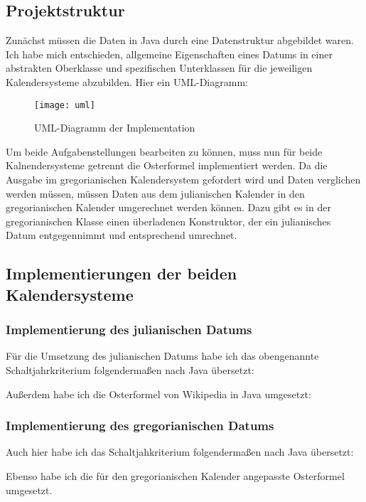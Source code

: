 \subsection{Projektstruktur}
Zunächst müssen die Daten in Java durch eine Datenstruktur abgebildet waren. Ich habe mich entschieden, allgemeine Eigenschaften eines Datums in einer abstrakten Oberklasse und spezifischen Unterklassen für die jeweiligen Kalendersysteme abzubilden. Hier ein UML-Diagramm:
\begin{figure}[h]
	\centering
	\texttt{[image: uml]}
	\caption{UML-Diagramm der Implementation}
\end{figure}

Um beide Aufgabenstellungen bearbeiten zu können, muss nun für beide Kalnendersysteme getrennt die Osterformel implementiert werden. Da die Ausgabe im gregorianischen Kalendersystem gefordert wird und Daten verglichen werden müssen, müssen Daten aus dem julianischen Kalender in den gregorianischen Kalender umgerechnet werden können. Dazu gibt es in der gregorianischen Klasse einen überladenen Konstruktor, der ein julianisches Datum entgegennimmt und entsprechend umrechnet.

\clearpage
\subsection{Implementierungen der beiden Kalendersysteme}
	\subsubsection{Implementierung des julianischen Datums}
	Für die Umsetzung des julianischen Datums habe ich das obengenannte Schaltjahrkriterium folgendermaßen nach Java übersetzt:
	
	
	Außerdem habe ich die Osterformel von Wikipedia in Java umgesetzt:

	
	
	\subsubsection{Implementierung des gregorianischen Datums}

	Auch hier habe ich das Schaltjahkriterium folgendermaßen nach Java übersetzt:
	
	Ebenso habe ich die für den gregorianischen Kalender angepasste Osterformel umgesetzt.
	


